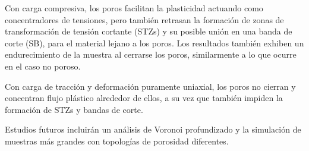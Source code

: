 Con carga compresiva, los poros facilitan la plasticidad actuando como concentradores de tensiones, pero también retrasan
la formación de zonas de transformación de tensión cortante (STZs) y su posible unión en una banda de corte (SB), para el material lejano a los poros.
Los resultados también exhiben un endurecimiento de la muestra al cerrarse los poros, similarmente a lo que ocurre en el caso no poroso.

Con carga de tracción y deformación puramente uniaxial, los poros no cierran y concentran flujo plástico alrededor de ellos, a su vez
que también impiden la formación de STZs y bandas de corte.

Estudios futuros incluirán un análisis de Voronoi profundizado y la simulación de muestras más grandes con topologías de porosidad diferentes.
